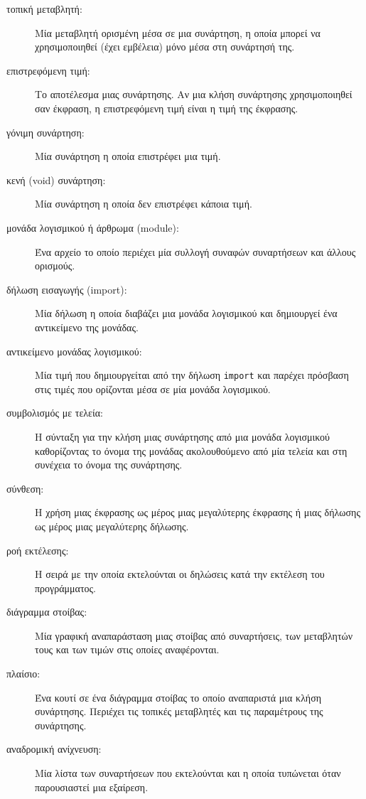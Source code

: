 \documentclass[10pt]{book}
\begin{document}
\begin{description}
\item[τοπική μεταβλητή:] Μία μεταβλητή ορισμένη μέσα σε μια συνάρτηση, η οποία 
μπορεί να χρησιμοποιηθεί (έχει εμβέλεια) μόνο μέσα στη συνάρτησή της.

\item[επιστρεφόμενη τιμή:] Το αποτέλεσμα μιας συνάρτησης. Αν μια κλήση συνάρτησης
χρησιμοποιηθεί σαν έκφραση, η επιστρεφόμενη τιμή είναι η τιμή της έκφρασης.

\item[γόνιμη συνάρτηση:] Μία συνάρτηση η οποία επιστρέφει μια τιμή.

\item[κενή  (void)  συνάρτηση:] Μία συνάρτηση η οποία δεν επιστρέφει κάποια τιμή.

\item[μονάδα λογισμικού ή άρθρωμα (module):] Ένα αρχείο το οποίο περιέχει μία συλλογή συναφών συναρτήσεων και άλλους ορισμούς.

\item[δήλωση εισαγωγής (import):] Μία δήλωση η οποία διαβάζει μια μονάδα λογισμικού και δημιουργεί ένα αντικείμενο της μονάδας.

\item[αντικείμενο μονάδας λογισμικού:] Μία τιμή που δημιουργείται από την δήλωση {\tt import} και παρέχει πρόσβαση στις τιμές που ορίζονται μέσα σε μία μονάδα λογισμικού.

\item[συμβολισμός με τελεία:] Η σύνταξη για την κλήση μιας συνάρτησης από μια μονάδα λογισμικού καθορίζοντας το όνομα της μονάδας ακολουθούμενο από μία τελεία και στη συνέχεια το όνομα της συνάρτησης.

\item[σύνθεση:] Η χρήση μιας έκφρασης ως μέρος μιας μεγαλύτερης έκφρασης
ή μιας δήλωσης ως μέρος μιας μεγαλύτερης δήλωσης.

\item[ροή εκτέλεσης:] Η σειρά με την οποία εκτελούνται οι δηλώσεις κατά την εκτέλεση του προγράμματος.

\item[διάγραμμα στοίβας:] Μία γραφική αναπαράσταση μιας στοίβας από συναρτήσεις, των μεταβλητών τους και των τιμών στις οποίες αναφέρονται.

\item[πλαίσιο:] Ένα κουτί σε ένα διάγραμμα στοίβας το οποίο αναπαριστά μια κλήση συνάρτησης.
Περιέχει τις τοπικές μεταβλητές και τις παραμέτρους της συνάρτησης.

\item[αναδρομική ανίχνευση:] Μία λίστα των συναρτήσεων που εκτελούνται και η οποία  τυπώνεται όταν παρουσιαστεί μια εξαίρεση.


\end{description}
\end{document}
